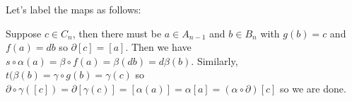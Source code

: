 \documentclass[11pt,letterpaper]{article}
\begin{document}
\begin{solution}
    Let's label the maps as follows:
    \begin{center}
    \end{center}
    Suppose $c\in C_n$, then there must be $a\in A_{n-1}$ and $b\in B_n$ with $g(b)=c$ and $f(a)=db$ so $\partial[c]=[a]$. Then we have $s\circ\alpha(a)=\beta\circ f(a)=\beta(db)=d\beta(b)$. Similarly, $t(\beta(b)=\gamma\circ g(b)=\gamma(c)$ so $\partial \circ \gamma([c])=\partial[\gamma(c)]=[\alpha(a)]=\alpha[a]=(\alpha\circ \partial)[c]$ so we are done.
\end{solution}
\end{document}
